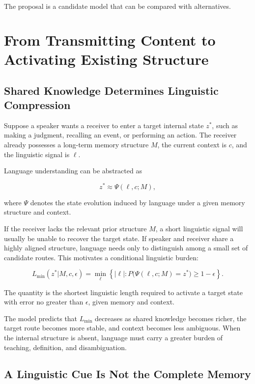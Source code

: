 \documentclass[11pt, a4paper]{article}
\begin{document}
The proposal is a candidate model that can be compared with alternatives.



\section{From Transmitting Content to Activating Existing Structure}


\subsection{Shared Knowledge Determines Linguistic Compression}


Suppose a speaker wants a receiver to enter a target internal state $z^*$, such as making a judgment, recalling an event, or performing an action. The receiver already possesses a long-term memory structure $M$, the current context is $c$, and the linguistic signal is $\ell$.


Language understanding can be abstracted as


\[
z^* \approx \Psi(\ell,c;M),
\]

where $\Psi$ denotes the state evolution induced by language under a given memory structure and context.


If the receiver lacks the relevant prior structure $M$, a short linguistic signal will usually be unable to recover the target state. If speaker and receiver share a highly aligned structure, language needs only to distinguish among a small set of candidate routes. This motivates a conditional linguistic burden:


\[
L_{\min}(z^*|M,c,\epsilon)
=
\min_{\ell}
\left\{
|\ell|:
P\big(\Psi(\ell,c;M)=z^*\big)\ge 1-\epsilon
\right\}.
\tag{1}
\]

The quantity is the shortest linguistic length required to activate a target state with error no greater than $\epsilon$, given memory and context.


The model predicts that $L_{\min}$ decreases as shared knowledge becomes richer, the target route becomes more stable, and context becomes less ambiguous. When the internal structure is absent, language must carry a greater burden of teaching, definition, and disambiguation.


\subsection{A Linguistic Cue Is Not the Complete Memory}
\end{document}
